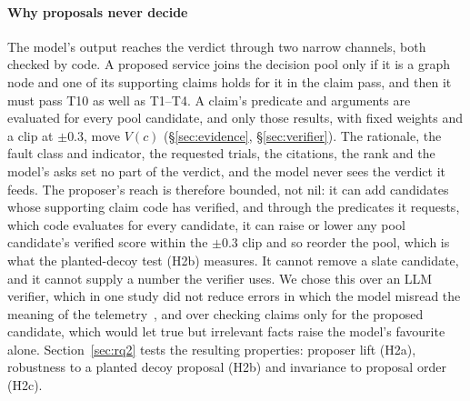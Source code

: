 \paragraph{Why proposals never decide}
The model's output reaches the verdict through two narrow channels, both checked by code.
A proposed service joins the decision pool only if it is a graph node and one of its supporting claims holds for it in the claim pass, and then it must pass T10 as well as T1--T4.
A claim's predicate and arguments are evaluated for every pool candidate, and only those results, with fixed weights and a clip at $\pm 0.3$, move $V(c)$ (\S\ref{sec:evidence}, \S\ref{sec:verifier}).
The rationale, the fault class and indicator, the requested trials, the citations, the rank and the model's asks set no part of the verdict, and the model never sees the verdict it feeds.
The proposer's reach is therefore bounded, not nil: it can add candidates whose supporting claim code has verified, and through the predicates it requests, which code evaluates for every candidate, it can raise or lower any pool candidate's verified score within the $\pm 0.3$ clip and so reorder the pool, which is what the planted-decoy test (H2b) measures.
It cannot remove a slate candidate, and it cannot supply a number the verifier uses.
We chose this over an LLM verifier, which in one study did not reduce errors in which the model misread the meaning of the telemetry~\cite{diagguard2026}, and over checking claims only for the proposed candidate, which would let true but irrelevant facts raise the model's favourite alone.
Section~\ref{sec:rq2} tests the resulting properties: proposer lift (H2a), robustness to a planted decoy proposal (H2b) and invariance to proposal order (H2c).

